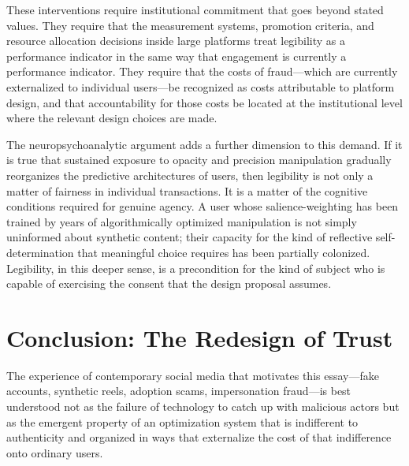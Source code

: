 \documentclass[12pt,a4paper]{article}
\begin{document}
These interventions require institutional commitment that goes beyond stated values. They require
that the measurement systems, promotion criteria, and resource allocation decisions inside large
platforms treat legibility as a performance indicator in the same way that engagement is currently
a performance indicator. They require that the costs of fraud---which are currently externalized
to individual users---be recognized as costs attributable to platform design, and that
accountability for those costs be located at the institutional level where the relevant design
choices are made.

The neuropsychoanalytic argument adds a further dimension to this demand. If it is true that
sustained exposure to opacity and precision manipulation gradually reorganizes the predictive
architectures of users, then legibility is not only a matter of fairness in individual
transactions. It is a matter of the cognitive conditions required for genuine agency. A user
whose salience-weighting has been trained by years of algorithmically optimized manipulation is
not simply uninformed about synthetic content; their capacity for the kind of reflective
self-determination that meaningful choice requires has been partially colonized. Legibility, in
this deeper sense, is a precondition for the kind of subject who is capable of exercising the
consent that the design proposal assumes.

\section{Conclusion: The Redesign of Trust}

The experience of contemporary social media that motivates this essay---fake accounts, synthetic
reels, adoption scams, impersonation fraud---is best understood not as the failure of technology
to catch up with malicious actors but as the emergent property of an optimization system that
is indifferent to authenticity and organized in ways that externalize the cost of that
indifference onto ordinary users.
\end{document}
